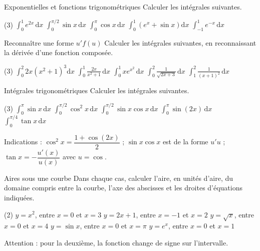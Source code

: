 
\begin{exercice}[2]{Exponentielles et fonctions trigonométriques}
Calculer les intégrales suivantes.
\begin{tasks}(3)
  \task $\displaystyle\int_0^1e^{2x}\,\mathrm{d}x$
  \task $\displaystyle\int_0^{\pi/2}\sin x\,\mathrm{d}x$
  \task $\displaystyle\int_0^{\pi}\cos x\,\mathrm{d}x$
  \task $\displaystyle\int_0^1\left(e^{x}+\sin x\right)\mathrm{d}x$
  \task $\displaystyle\int_{-1}^1e^{-x}\,\mathrm{d}x$
\end{tasks}
\end{exercice}

\begin{exercice}[2]{Reconnaître une forme $u'f(u)$}
Calculer les intégrales suivantes, en reconnaissant la dérivée d'une fonction composée.
\begin{tasks}(3)
  \task $\displaystyle\int_0^2 2x\left(x^{2}+1\right)^{3}\mathrm{d}x$
  \task $\displaystyle\int_0^1\frac{2x}{x^{2}+1}\,\mathrm{d}x$
  \task $\displaystyle\int_0^1xe^{x^{2}}\,\mathrm{d}x$
  \task $\displaystyle\int_0^2\frac{1}{\sqrt{2x+3}}\,\mathrm{d}x$
  \task $\displaystyle\int_1^2\frac{1}{(x+1)^{2}}\,\mathrm{d}x$
\end{tasks}
\end{exercice}

\begin{exercice}[2]{Intégrales trigonométriques}
Calculer les intégrales suivantes.
\begin{tasks}(3)
  \task $\displaystyle\int_0^{\pi}\sin x\,\mathrm{d}x$
  \task $\displaystyle\int_0^{\pi/2}\cos^{2}x\,\mathrm{d}x$
  \task $\displaystyle\int_0^{\pi/2}\sin x\cos x\,\mathrm{d}x$
  \task $\displaystyle\int_0^{\pi}\sin(2x)\,\mathrm{d}x$
  \task $\displaystyle\int_0^{\pi/4}\tan x\,\mathrm{d}x$
\end{tasks}
Indications : $\cos^{2}x=\dfrac{1+\cos(2x)}{2}$ ; $\sin x\cos x$ est de la forme $u'u$ ; $\tan x=-\dfrac{u'(x)}{u(x)}$ avec $u=\cos$.
\end{exercice}

\begin{exercice}[2]{Aires sous une courbe}
Dans chaque cas, calculer l'aire, en unités d'aire, du domaine compris entre la courbe, l'axe des abscisses et les droites
d'équations indiquées.
\begin{tasks}(2)
  \task $y=x^{2}$, entre $x=0$ et $x=3$
  \task $y=2x+1$, entre $x=-1$ et $x=2$
  \task $y=\sqrt x$, entre $x=0$ et $x=4$
  \task $y=\sin x$, entre $x=0$ et $x=\pi$
  \task $y=e^{x}$, entre $x=0$ et $x=1$
\end{tasks}
Attention : pour la deuxième, la fonction change de signe sur l'intervalle.
\end{exercice}

